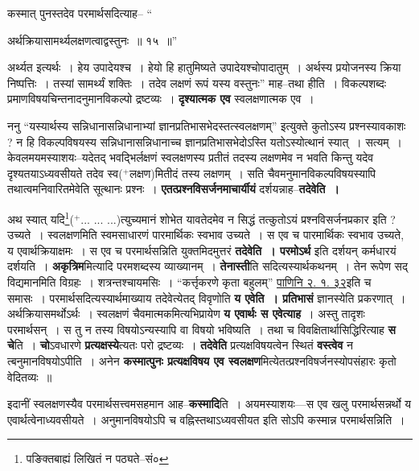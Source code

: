 \documentclass[article,12pt,a4paper]{memoir}
\newcommand{\add}[1]{($^{+}$#1)}
\begin{document}
	कस्मात् पुनस्तदेव परमार्थसदित्याह-- “
	  
	अर्थक्रियासामर्थ्यलक्षणत्वाद्वस्तुनः ॥ १५ ॥” 
	  
	अर्थ्यत इत्यर्थः । हेय उपादेयश्च । हेयो हि हातुमिष्यते उपादेयश्चोपादातुम् । अर्थस्य प्रयोजनस्य क्रिया निष्पत्तिः । तस्यां सामर्थ्यं शक्तिः । तदेव लक्षणं रूपं यस्य वस्तुनः” माह--तथा हीति । विकल्पशब्दः प्रमाणविषयचिन्तनादनुमानविकल्पो द्रष्टव्यः । \textbf{दृश्यात्मक एव} स्वलक्षणात्मक एव ।
	\pend
      

	  \pstart ननु “यस्यार्थस्य सन्निधानासन्निधानाभ्यां ज्ञानप्रतिभासभेदस्तत्स्वलक्षणम्” इत्युक्ते कुतोऽस्य प्रश्नस्यावकाशः ? न हि विकल्पविषयस्य सन्निधानासन्निधानाच्च ज्ञानप्रतिभासभेदोऽस्ति यतोऽस्योत्थानं स्यात् । सत्यम् । केवलमयमस्याशयः--यदेतद् भवद्भिर्लक्षणं स्वलक्षणस्य प्रतीतं तदस्य लक्षणमेव न भवति किन्तु यदेव दृश्यतयाऽध्यवसीयते तदेव स्व\add{लक्षण}मितीदं तस्य लक्षणम् । सति चैवमनुमानविकल्पविषयस्यापि तथात्वमनिवारितमेवेति सूत्थानः प्रश्नः । \textbf{एतत्प्रश्नविसर्जनमाचार्यीयं} दर्शयन्नाह--\textbf{तदेवेति ।}
	\pend
      

	  \pstart अथ स्यात् यदि\footnote{पङिक्तबाह्यं लिखितं न पठ्यते--सं०}\add{... ... ...}त्युच्यमानं शोभेत यावतेदमेव न सिद्धं तत्कुतोऽयं प्रश्नविसर्जनप्रकार इति ? उच्यते । स्वलक्षणमिति स्वमसाधारणं पारमार्थिकः स्वभाव उच्यते । स एव च पारमार्थिकः स्वभाव उच्यते, य एवार्थक्रियाक्षमः । स एव च परमार्थसन्निति युक्तमिदमुत्तरं \textbf{तदेवेति । परमोऽर्थ} इति दर्शयन् कर्मधारयं दर्शयति । \textbf{अकृत्रिम}मित्यादि परमशब्दस्य व्याख्यानम् । \textbf{तेनास्ती}ति सदित्यस्यार्थकथनम् । तेन रूपेण सद् विद्यमानमिति विग्रहः । शत्रन्तश्चायमसिः । “कर्त्तृकरणे कृता बहुलम्” \href{http://http://sarit.indology.info/?cref=Pā.2.1.32}{पाणिनि २. १. ३२}इति च समासः । परमार्थसदित्यस्यार्थमाख्याय तदेवेत्येतद् विवृणोति \textbf{य एवेति । प्रतिभासं} ज्ञानस्येति प्रकरणात् । अर्थक्रियासमर्थोऽर्थः । स्वलक्षणं चैवमात्मकमित्यभिप्रायेण \textbf{य एवार्थः स एवेत्याह} । अस्तु तादृशः परमार्थसन् । स तु न तस्य विषयोऽन्यस्यापि वा विषयो भविष्यति । तथा च विवक्षितार्थासिद्धिरित्याह \textbf{स चे}ति । \textbf{चो}ऽवधारणे \textbf{प्रत्यक्षस्ये}त्यतः परो द्रष्टव्यः । \textbf{तदेवेति} प्रत्यक्षविषयत्वेन स्थितं \textbf{वस्त्वेव} न त्बनुमानविषयोऽपीति । अनेन \textbf{कस्मात्पुनः प्रत्यक्षविषय एव स्वलक्षण}मित्येतत्प्रश्नविषर्जनस्योपसंहारः कृतो वेदितव्यः ॥
	\pend
      

	  \pstart इदानीं स्वलक्षणस्यैव परमार्थसत्त्वमसहमान आह--\textbf{कस्मादि}ति । अयमस्याशयः—स एव खलु परमार्थसन्नर्थो य एवार्थत्वेनाध्यवसीयते । अनुमानविषयोऽपि च वह्निस्तथाऽध्यवसीयत इति सोऽपि कस्मान्न परमा\leavevmode{}र्थसन्निति ।
	\pend
      
\end{document}
